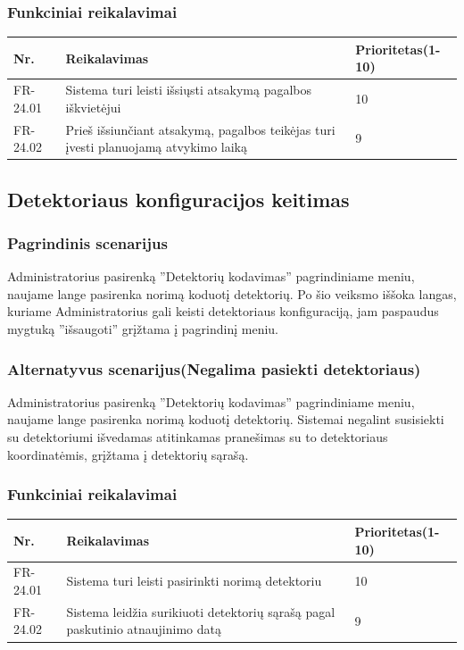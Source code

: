 \documentclass[oneside]{VUMIFPSkursinis}
\begin{document}
	\subsubsection{Funkciniai reikalavimai}
	\begin{table}[htbp]
		\begin{tabularx}{1\textwidth}{ |P{2.5cm}|X|P{3cm }| }  \hline
			Nr. & Reikalavimas & Prioritetas(1-10) \\ \hline
			FR-24.01 & Sistema turi leisti išsiųsti atsakymą pagalbos iškvietėjui & 10 \\ \hline
			FR-24.02 & Prieš išsiunčiant atsakymą, pagalbos teikėjas turi įvesti planuojamą atvykimo laiką & 9 \\ \hline
		\end{tabularx}
	\end{table}
	
	\subsection{Detektoriaus konfiguracijos keitimas}
	\subsubsection{Pagrindinis scenarijus}
	Administratorius pasirenką ''Detektorių kodavimas'' pagrindiniame meniu, naujame lange pasirenka norimą koduotį detektorių. Po šio veiksmo iššoka langas, kuriame Administratorius gali keisti detektoriaus konfiguraciją, jam paspaudus mygtuką ''išsaugoti'' grįžtama į pagrindinį meniu.
	\subsubsection{Alternatyvus scenarijus(Negalima pasiekti detektoriaus)}
	Administratorius pasirenką ''Detektorių kodavimas'' pagrindiniame meniu, naujame lange pasirenka norimą koduotį detektorių. Sistemai negalint susisiekti su detektoriumi išvedamas atitinkamas pranešimas su to detektoriaus koordinatėmis, grįžtama į detektorių sąrašą.
	\subsubsection{Funkciniai reikalavimai}
	\begin{table}[htbp]
		\begin{tabularx}{1\textwidth}{ |P{2.5cm}|X|P{3cm }| }  \hline
			Nr. & Reikalavimas & Prioritetas(1-10) \\ \hline
			FR-24.01 &  Sistema turi leisti pasirinkti norimą detektoriu & 10 \\ \hline
			FR-24.02 &  Sistema leidžia surikiuoti detektorių sąrašą pagal paskutinio atnaujinimo datą & 9 \\ \hline
		\end{tabularx}
	\end{table}
\end{document}
